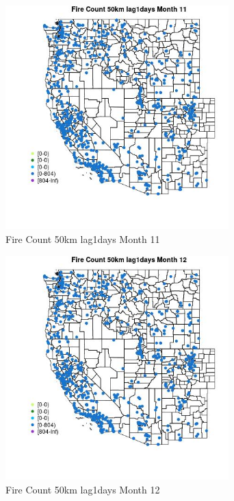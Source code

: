 \begin{figure} 
\centering  
\includegraphics[width=0.77\textwidth]{Code_Outputs/Report_ML_input_PM25_Step4_part_f_de_duplicated_aves_prioritize_24hr_obswNAs_MapObsMo11Fire_Count_50km_lag1days.jpg} 
\caption{\label{fig:Report_ML_input_PM25_Step4_part_f_de_duplicated_aves_prioritize_24hr_obswNAsMapObsMo11Fire_Count_50km_lag1days}Fire Count 50km lag1days Month 11} 
\end{figure} 
 

\begin{figure} 
\centering  
\includegraphics[width=0.77\textwidth]{Code_Outputs/Report_ML_input_PM25_Step4_part_f_de_duplicated_aves_prioritize_24hr_obswNAs_MapObsMo12Fire_Count_50km_lag1days.jpg} 
\caption{\label{fig:Report_ML_input_PM25_Step4_part_f_de_duplicated_aves_prioritize_24hr_obswNAsMapObsMo12Fire_Count_50km_lag1days}Fire Count 50km lag1days Month 12} 
\end{figure} 
 

